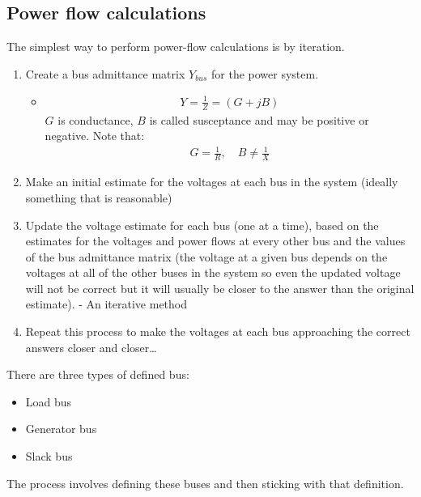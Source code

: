 \subsection{Power flow calculations}
The simplest way to perform power-flow calculations is by iteration.
\begin{enumerate}
	\item Create a bus admittance matrix $Y_{bus}$ for the power system.
	      \begin{itemize}
		      \item \begin{gather}
			            Y = \frac{1}{Z} = \left(G + jB\right)
		            \end{gather}
		            $G$ is conductance, $B$ is called susceptance and may be positive or negative. Note that:
		            \begin{gather}
			            G = \frac{1}{R}, \quad B \neq \frac{1}{X}
		            \end{gather}
	      \end{itemize}
	\item Make an initial estimate for the voltages at each bus in the system (ideally something that is reasonable)
	\item Update the voltage estimate for each bus (one at a time), based on the estimates for the voltages and power flows at every other bus and the values of the bus admittance matrix (the voltage at a given bus depends on the voltages at all of the other buses in the system so even the updated voltage will not be correct but it will usually be closer to the answer than the original estimate). - An iterative method
	\item Repeat this process to make the voltages at each bus approaching the correct answers closer and closer\dots
\end{enumerate}
There are three types of defined bus:
\begin{itemize}
	\item Load bus
	\item Generator bus
	\item Slack bus
\end{itemize}
The process involves defining these buses and then sticking with that definition.
